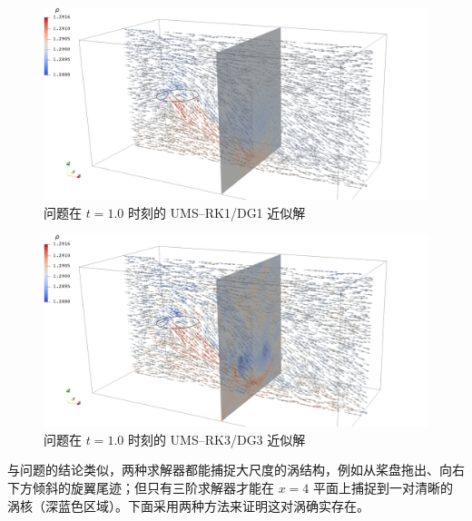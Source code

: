 \begin{figure}[h!]
\begin{centering}
\includegraphics[width=1\textwidth,height=0.26\textheight,keepaspectratio]{figures/forward/p=1/Frame100}
\par\end{centering}
\caption{\label{fig:forward_t=00003D10e-1_p=00003D1}问题在
$t=1.0$ 时刻的 UMS–RK1/DG1 近似解}
\end{figure}

\begin{figure}[h!]
\begin{centering}
\includegraphics[width=1\textwidth,height=0.26\textheight,keepaspectratio]{figures/forward/p=3/Frame100}
\par\end{centering}
\caption{\label{fig:forward_t=00003D10e-1_p=00003D3}问题在
$t=1.0$ 时刻的 UMS–RK3/DG3 近似解}
\end{figure}

与问题的结论类似，两种求解器都能捕捉大尺度的涡结构，例如从桨盘拖出、向右下方倾斜的旋翼尾迹；但只有三阶求解器才能在
$x=4$ 平面上捕捉到一对清晰的涡核（深蓝色区域）。下面采用两种方法来证明这对涡确实存在。


